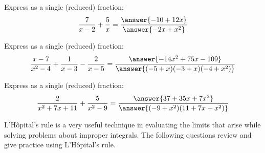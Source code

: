 \documentclass{ximera}
\begin{document}
\begin{problem}
  Express as a single (reduced) fraction:
  \[
  \frac{7}{x-2}+\frac{5}{x} = \frac{\answer{-10+12x}}{\answer{-2x+x^2}}
  \]
\end{problem}


\begin{problem}
  Express as a single (reduced) fraction:
  \[
  \frac{x-7}{x^2-4} + \frac{1}{x-3} - \frac{2}{x-5} = \frac{\answer{-14x^2+75x-109}}{\answer{(-5 + x) (-3 + x) (-4 + x^2)}}
  \]
\end{problem}


\begin{problem}
  Express as a single (reduced) fraction:
  \[
  \frac{2}{x^2+7x+11} + \frac{5}{x^2-9} = \frac{\answer{37 + 35 x + 7 x^2}}{\answer{(-9 + x^2) (11 + 7 x + x^2)}}
  \]
\end{problem}

\begin{problem}
  ​L'H\^opital's rule is a very useful technique in evaluating the limits
  that arise while solving problems about improper integrals.  The
  following questions review and give practice using​ L'H\^opital's rule.
  \begin{multipleChoice}
  \end{multipleChoice}
\end{problem}
\end{document}
